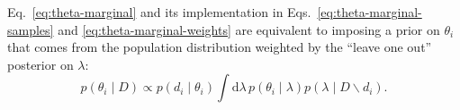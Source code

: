 \documentclass[modern]{aastex63}
\newcommand{\dd}{\ensuremath{\mathrm{d}}}
\begin{document}
Eq.\ \eqref{eq:theta-marginal} and its implementation in Eqs.\
\eqref{eq:theta-marginal-samples} and \eqref{eq:theta-marginal-weights} are
equivalent to imposing a prior on $\theta_i$ that comes from the population
distribution weighted by the ``leave one out'' posterior on $\lambda$:
%
\begin{equation}
  p\left( \theta_i \mid D \right) \propto p\left( d_i \mid \theta_i \right) \int \dd \lambda \, p\left( \theta_i \mid \lambda \right) p\left( \lambda \mid D \backslash d_i \right).
\end{equation}
%


\end{document}

